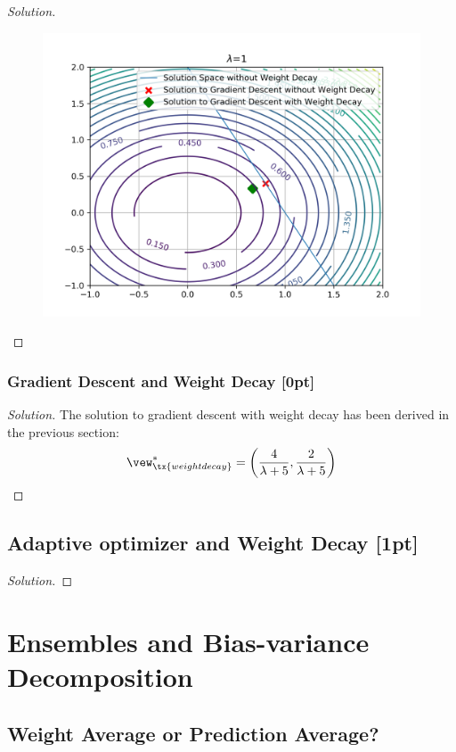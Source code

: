 \documentclass{article}
\begin{document}
\begin{proof}[Solution]
\begin{figure}[H]
			\includegraphics[width=\linewidth]{plot_q1.png}
		\end{figure}
	\end{proof}
	
	\subsubsection{Gradient Descent and Weight Decay [0pt]}
	\begin{proof}[Solution]
		The solution to gradient descent with weight decay has been derived in the previous section:
		\begin{align}
			\vew^*_\tx{weight decay} = \left(\frac{4}{\lambda +5}, \frac{2}{\lambda +5}\right)
		\end{align}
	\end{proof}
	
	\subsection{Adaptive optimizer and Weight Decay [1pt]}
	\begin{proof}[Solution]
		
	\end{proof}
	
	\section{Ensembles and Bias-variance Decomposition}
	\subsection{Weight Average or Prediction Average?}
\end{document}
